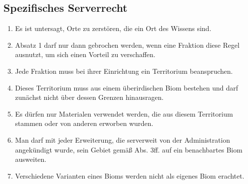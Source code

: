 \documentclass{article}
\begin{document}
\subsection{Spezifisches Serverrecht}
\begin{enumerate}[(1)]
	\item Es ist untersagt, Orte zu zerstören, die ein Ort des Wissens sind.
	\item Absatz 1 darf nur dann gebrochen werden, wenn eine Fraktion diese Regel ausnutzt, um sich einen Vorteil zu verschaffen.
	\item Jede Fraktion muss bei ihrer Einrichtung ein Territorium beanspruchen.
	\item Dieses Territorium muss aus einem überirdischen Biom bestehen und darf zunächst nicht über dessen Grenzen hinausragen.
	\item Es dürfen nur Materialen verwendet werden, die aus diesem Territorium stammen oder von anderen erworben wurden.
	\item Man darf mit jeder Erweiterung, die serverweit von der Administration angekündigt wurde, sein Gebiet gemäß Abs. 3ff. auf ein benachbartes Biom ausweiten.
	\item Verschiedene Varianten eines Bioms werden nicht als eigenes Biom erachtet.
\end{enumerate}
\end{document}
